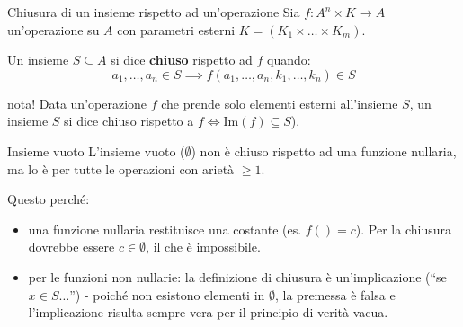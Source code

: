 \documentclass[a4paper,11pt]{report}
\begin{document}
\begin{defframe}{Chiusura di un insieme rispetto ad un'operazione}{}
    Sia \( f: A^n \times K \to A \) un'operazione su \( A \) con parametri esterni \( K = (K_1 \times \dots \times K_m) \). 

    Un insieme \( S \subseteq A \) si dice \textbf{chiuso} rispetto ad \( f \) quando:
    \[
        a_1, \dots, a_n \in S \implies f( a_1, \dots, a_n,  k_1, \dots, k_n) \in S
    \]

    \begin{gframe}{nota!}
        Data un'operazione \( f \) che prende solo elementi esterni all'insieme \( S \), un insieme \( S \) si dice chiuso rispetto a \(f \iff \text{Im}(f) \subseteq S \)).
    \end{gframe}

    \begin{gframe}{Insieme vuoto}
        L'insieme vuoto (\( \emptyset \)) non è chiuso rispetto ad una funzione nullaria, ma lo è per tutte le operazioni con arietà \( \geq 1 \).

        Questo perché:
    \begin{itemize}
        \item una funzione nullaria restituisce una costante (es. \( f() = c \)). Per la chiusura dovrebbe essere \( c \in \emptyset \), il che è impossibile.
        \item per le funzioni non nullarie: la definizione di chiusura è un'implicazione (``se \( x \in S \dots \)'') - poiché non esistono elementi in \( \emptyset \), la premessa è falsa e l'implicazione risulta sempre vera per il principio di verità vacua.
    \end{itemize}
    \end{gframe}
\end{defframe}
\end{document}
